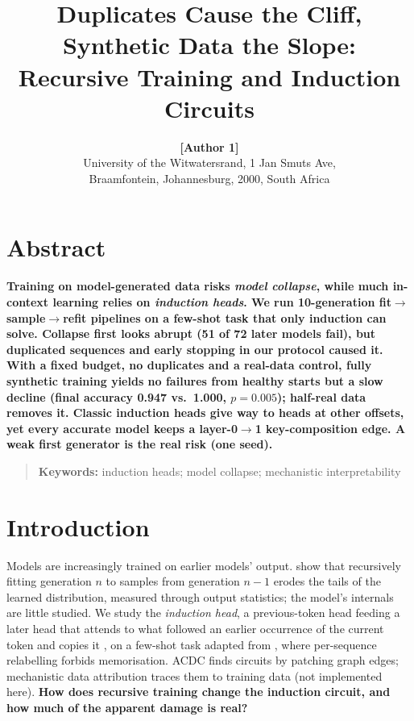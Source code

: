 \documentclass[10pt,letterpaper]{article}
\title{Duplicates Cause the Cliff, Synthetic Data the Slope: Recursive Training and Induction Circuits}
\author{{\large \bf [Author 1]} \\ University of the Witwatersrand, 1 Jan Smuts Ave,\\ Braamfontein, Johannesburg, 2000, South Africa}
\begin{document}
\maketitle

\section{Abstract}
{
\bf
{}
Training on model-generated data risks \emph{model collapse}, while much
in-context learning relies on \emph{induction heads}. We run 10-generation
fit$\to$sample$\to$refit pipelines on a few-shot task that only induction can
solve. Collapse first looks abrupt (51 of 72 later models fail), but duplicated
sequences and early stopping in our protocol caused it. With a fixed budget, no
duplicates and a real-data control, fully synthetic training yields no failures
from healthy starts but a slow decline (final accuracy 0.947 vs.\ 1.000,
$p{=}0.005$); half-real data removes it. Classic induction heads give way to heads
at other offsets, yet every accurate model keeps a layer-0$\to$1 key-composition
edge. A weak first generator is the real risk (one seed).
}
\begin{quote}
\small
\textbf{Keywords:} induction heads; model collapse; mechanistic interpretability
\end{quote}

\section{Introduction} \label{Intro}
Models are increasingly trained on earlier models' output.
\citet{shumailov2023curse,shumailov2024ai} show that recursively fitting
generation $n$ to samples from generation $n{-}1$ erodes the tails of the learned
distribution, measured through output statistics; the model's internals are little
studied. We study the \emph{induction head}, a previous-token head feeding a later
head that attends to what followed an earlier occurrence of the current token and
copies it \citep{olsson2022incontext}, on a few-shot task adapted from
\citet{singh2024needs}, where per-sequence relabelling forbids memorisation. ACDC
\citep{conmy2023towards} finds circuits by patching graph edges; mechanistic data
attribution \citep{chen2026mechanistic} traces them to training data (not
implemented here). \textbf{How does recursive training change the induction
circuit, and how much of the apparent damage is real?}
\end{document}
